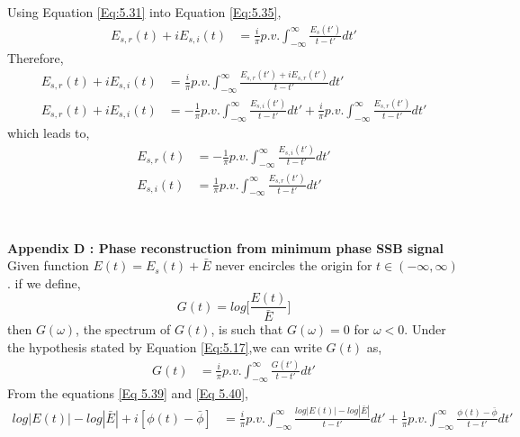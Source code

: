 Using Equation \ref{Eq:5.31} into Equation \ref{Eq:5.35},
\begin{equation}
\begin{split}
E_{s,r}(t)+iE_{s,i}(t) &=\frac{i}{\pi} p.v. \int_{-\infty}^{\infty} \frac{E_s(t')}{t-t'} dt' 
\end{split}
\label{Eq:5.36}
\end{equation}
Therefore,
\begin{equation}
\begin{split}
E_{s,r}(t)+iE_{s,i}(t) &=\frac{i}{\pi} p.v. \int_{-\infty}^{\infty} \frac{E_{s,r}(t')+iE_{s,r}(t')}{t-t'} dt' \\
E_{s,r}(t)+iE_{s,i}(t)&=-\frac{1}{\pi} p.v. \int_{-\infty}^{\infty} \frac{E_{s,i}(t')}{t-t'} dt' + \frac{i}{\pi} p.v. \int_{-\infty}^{\infty} \frac{E_{s,r}(t')}{t-t'} dt'
\end{split}
\label{Eq:5.37}
\end{equation}
which leads to,
\begin{equation}
\begin{split}
E_{s,r}(t) &=-\frac{1}{\pi} p.v. \int_{-\infty}^{\infty} \frac{E_{s,i}(t')}{t-t'} dt' \\
E_{s,i}(t) &=\frac{1}{\pi} p.v. \int_{-\infty}^{\infty} \frac{E_{s,r}(t')}{t-t'} dt' \\
\end{split}
\label{Eq:5.38}
\end{equation}
\\
\\
\textbf{Appendix D : Phase reconstruction from minimum phase SSB signal}\\
Given function $E(t)=E_{s}(t)+\bar{E}$ never encircles the origin for $t\in(-\infty,\infty)$. if we define,
\begin{equation}
G(t)=log\bigg[\dfrac{E(t)}{\bar{E}}\bigg]
\label{Eq 5.39}
\end{equation} 
then $G(\omega)$, the spectrum of $G(t)$, is such that $G(\omega)=0$ for $\omega<0$. Under the hypothesis stated by Equation \ref{Eq:5.17},we can write $G(t)$ as,
\begin{equation}
\begin{split}
G(t) &=\frac{i}{\pi} p.v. \int_{-\infty}^{\infty} \frac{G(t')}{t-t'} dt' 
\end{split}
\label{Eq 5.40}
\end{equation}
From the equations \ref{Eq 5.39} and \ref{Eq 5.40},
\begin{equation}
\begin{split}
log|E(t)|-log|\bar{E}|+i[\phi(t)-\bar{\phi}] &=\frac{i}{\pi} p.v. \int_{-\infty}^{\infty} \frac{log|E(t)|-log|\bar{E}|}{t-t'} dt' + \frac{1}{\pi} p.v. \int_{-\infty}^{\infty} \frac{\phi(t)-\bar{\phi}}{t-t'} dt' 
\end{split}
\label{Eq 5.41}
\end{equation}
